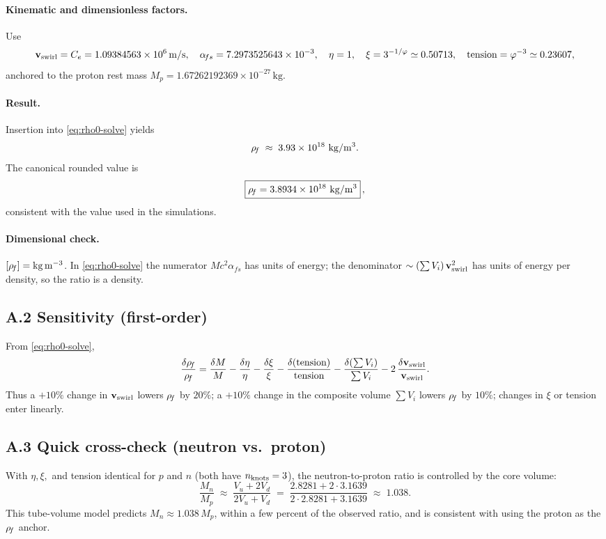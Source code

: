 \paragraph{Kinematic and dimensionless factors.}
Use
\[
    \mathbf{v}_{\mathrm{swirl}} = C_e = 1.09384563\times10^6\,\mathrm{m/s},\quad
    \alpha_{\!fs}=7.2973525643\times10^{-3},\quad
    \eta=1,\quad \xi = 3^{-1/\varphi}\simeq 0.50713,\quad
    \text{tension} = \varphi^{-3} \simeq 0.23607,
\]
anchored to the proton rest mass \(M_p=1.67262192369\times10^{-27}\,\mathrm{kg}\).

\paragraph{Result.}
Insertion into \eqref{eq:rho0-solve} yields
\[
    \rhof \;\approx\; 3.93\times 10^{18}\ \mathrm{kg/m^3}.
\]
The canonical rounded value is
\[
    \boxed{ \rhof = 3.8934\times 10^{18}\ \mathrm{kg/m^3} }\,,
\]
consistent with the value used in the simulations.

\paragraph{Dimensional check.}
\([\rho_{\!f}]=\mathrm{kg\,m^{-3}}\).
In \eqref{eq:rho0-solve} the numerator \(M c^2\alpha_{\!fs}\) has units of energy; the denominator
\(\sim (\sum V_i)\,\mathbf{v}_{\mathrm{swirl}}^{2}\) has units of energy per density, so the ratio is a density.

\subsection*{A.2 Sensitivity (first-order)}
From \eqref{eq:rho0-solve},
\[
    \frac{\delta\rho_{\!f}}{\rho_{\!f}}
    = \frac{\delta M}{M}
    - \frac{\delta\eta}{\eta}
    - \frac{\delta\xi}{\xi}
    - \frac{\delta(\text{tension})}{\text{tension}}
    - \frac{\delta(\sum V_i)}{\sum V_i}
    - 2\,\frac{\delta \mathbf{v}_{\mathrm{swirl}}}{\mathbf{v}_{\mathrm{swirl}}}.
\]
Thus a \(+10\%\) change in \(\mathbf{v}_{\mathrm{swirl}}\) lowers \(\rho_{\!f}\) by \(20\%\); a \(+10\%\) change in the composite volume \(\sum V_i\) lowers \(\rho_{\!f}\) by \(10\%\); changes in \(\xi\) or tension enter linearly.

\subsection*{A.3 Quick cross-check (neutron vs.\ proton)}
With \(\eta,\xi,\) and tension identical for \(p\) and \(n\) (both have \(n_{\rm knots}=3\)),
the neutron-to-proton ratio is controlled by the core volume:
\[
    \frac{M_n}{M_p}\;\approx\;\frac{V_u + 2V_d}{2V_u + V_d}
    \;=\; \frac{2.8281 + 2\cdot 3.1639}{2\cdot 2.8281 + 3.1639}
    \;\approx\; 1.038.
\]
This tube-volume model predicts \(M_n \approx 1.038\,M_p\), within a few percent of the observed ratio, and is consistent with using the proton as the \(\rho_{\!f}\) anchor.
